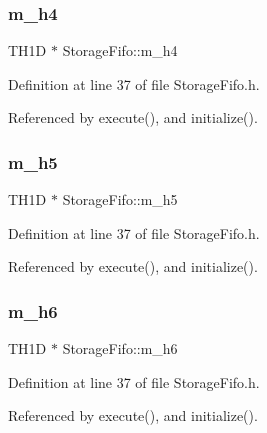 \subsubsection{\texorpdfstring{m\+\_\+h4}{m\_h4}}
{\footnotesize\ttfamily T\+H1D $\ast$ Storage\+Fifo\+::m\+\_\+h4\hspace{0.3cm}{\ttfamily [private]}}



Definition at line 37 of file Storage\+Fifo.\+h.



Referenced by execute(), and initialize().

\mbox{\label{classStorageFifo_ae9133c5421f9fa166b837933706d2a59}} 
\subsubsection{\texorpdfstring{m\+\_\+h5}{m\_h5}}
{\footnotesize\ttfamily T\+H1D $\ast$ Storage\+Fifo\+::m\+\_\+h5\hspace{0.3cm}{\ttfamily [private]}}



Definition at line 37 of file Storage\+Fifo.\+h.



Referenced by execute(), and initialize().

\mbox{\label{classStorageFifo_a39ca376b2a74643c54e4df2dfabf0906}} 
\subsubsection{\texorpdfstring{m\+\_\+h6}{m\_h6}}
{\footnotesize\ttfamily T\+H1D $\ast$ Storage\+Fifo\+::m\+\_\+h6\hspace{0.3cm}{\ttfamily [private]}}



Definition at line 37 of file Storage\+Fifo.\+h.



Referenced by execute(), and initialize().

\mbox{\label{classStorageFifo_a01784ff4138a1b32eb517931b5866cc6}} 
